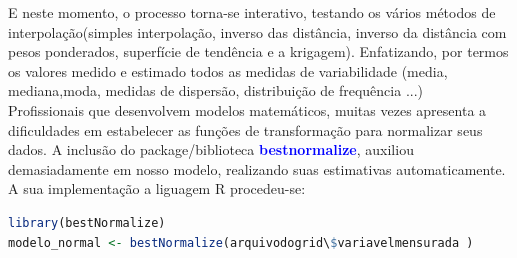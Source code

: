 \hspace*{1.25 cm}  E neste momento, o processo torna-se interativo, testando os vários métodos de interpolação(simples interpolação, inverso das distância, inverso da distância com pesos ponderados, superfície de tendência e a krigagem). Enfatizando, por  termos os valores medido e estimado todos as medidas de variabilidade (media, mediana,moda, medidas de dispersão, distribuição de frequência ...)  \\
%
\hspace*{1.25 cm}  Profissionais que desenvolvem modelos matemáticos, muitas vezes apresenta a dificuldades em estabelecer as funções de transformação para normalizar seus dados. A inclusão  do package/biblioteca \textbf{\textcolor{blue}{bestnormalize}}, auxiliou demasiadamente em nosso modelo, realizando suas estimativas automaticamente. A sua implementação a liguagem R procedeu-se:
 \lstset{
	language=R, %
	caption= normalizacao do modelo em linguagem R,} %
\begin{lstlisting}[language=R]
 library(bestNormalize)
modelo_normal <- bestNormalize(arquivodogrid\$variavelmensurada )
\end{lstlisting}  

